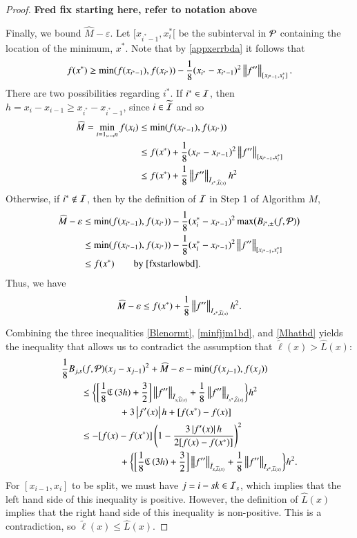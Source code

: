 \documentclass[review]{elsarticle}
\newcommand{\abstol}{\varepsilon}
\theoremstyle{definition}
\newcommand{\tell}{\tilde{\ell}}
\newcommand{\chL}{\widehat{L}}
\newcommand{\hM}{\widehat{M}}
\begin{document}
\begin{proof}
\textbf{Fred fix starting here, refer to notation above}
 
Finally, we bound $ \widehat{M}-\abstol$. Let $[x_{i^*-1}, x^*_i[$ be the
subinterval in $\cp$ containing the location of the minimum, $x^*$. Note that by
\eqref{appxerrbda} it follows that
\begin{equation} \label{fxstarlowbd}
f(x^*) \ge \min(f(x_{i^*-1}),f(x_{i^*})) - \frac18 (x_{i^*} - x_{i^*-1})^2\norm[{[x_{i^*-1}, x^*_i]}]{f''}.
\end{equation}
There are two possibilities regarding $i^*$. If $i^* \in \ci$, then $h = x_i -
x_{i-1} \ge x_{i^*} - x_{i^*-1}$, since $i \in \widetilde{\ci}$ and so
\begin{align*}
\hM  = \min_{i=1, \ldots, n} f(x_i) & \le \min(f(x_{i^*-1}),f(x_{i^*})) \\
& \le f(x^*) + \frac18  (x_{i^*} - x_{i^*-1})^2\norm[{[x_{i^*-1}, x^*_i]}]{f''} \\
& \le  f(x^*) + \frac18 \norm[{\bar{I}_{x^*,\chL(x)}}]{f''} h^2
\end{align*}
Otherwise, if $i^* \notin \ci$, then by the definition of $\ci$ in Step 1 of
Algorithm $M$,
\begin{align*}
\hM   - \abstol & \le \min(f(x_{i^*-1}),f(x_{i^*})) - \frac18 (x^*_i - x_{i^*-1})^2 \max \bigl(B_{i^*,\pm}(f,\cp) \bigr)  \\
& \le \min(f(x_{i^*-1}),f(x_{i^*})) - \frac18 (x^*_i - x_{i^*-1})^2 \norm[{[x_{i^*-1}, x^*_i]}]{f''}   \\
& \le  f(x^*) \qquad \text{by}~\eqref{fxstarlowbd} .
\end{align*}
Thus, we have
\begin{equation} \label{Mhatbd}
\hM - \abstol \le f(x^*) + \frac 18 \norm[{I_{x^*,\chL(x)}}]{f''} h^2.
\end{equation}

Combining the three inequalities \eqref{Blenormt}, \eqref{minfjjm1bd}, and
\eqref{Mhatbd} yields the inequality that allows us to contradict the assumption
that $\tell(x) > \chL(x)$:
\begin{align*}
\MoveEqLeft{\frac 18 B_{j,s}(f,\cp)(x_j-x_{j-1})^2 + \hM -\abstol - \min(f(x_{j-1}),f(x_{j}))} \\
& \le \biggl\{ \biggl[\frac 18 \fC\left(3h\right) + \frac 32 \biggr]   \norm[\bar{I}_{x,\chL(x)}]{f''} + \frac18\norm[{I_{x^*,\chL(x)}}]{f''} \biggr\} h^2 \\
& \qquad \qquad +  3 \abs{f'(x)} h + [f(x^*) - f(x)] \\
&  \le -[f(x) - f(x^*)] \left( 1 - \frac{3\abs{f'(x)}h}{2[f(x) - f(x^*)] } \right)^2  \\
& \qquad \qquad  +  \biggl\{ \biggl[\frac 18 \fC\left(3h\right) + \frac 32 \biggr]   \norm[\bar{I}_{x,\chL(x)}]{f''} + \frac18\norm[{I_{x^*,\chL(x)}}]{f''} \biggr\} h^2.
\end{align*}
For $[x_{i-1},x_i]$ to be split, we must have $j = i - sk \in \ci_s$, which
implies that the left hand side of this inequality is positive. However, the
definition of $\chL(x)$ implies that the right hand side of this inequality is
non-positive. This is a contradiction, so $\tell(x) \le \chL(x)$.
\end{proof}
\end{document}
